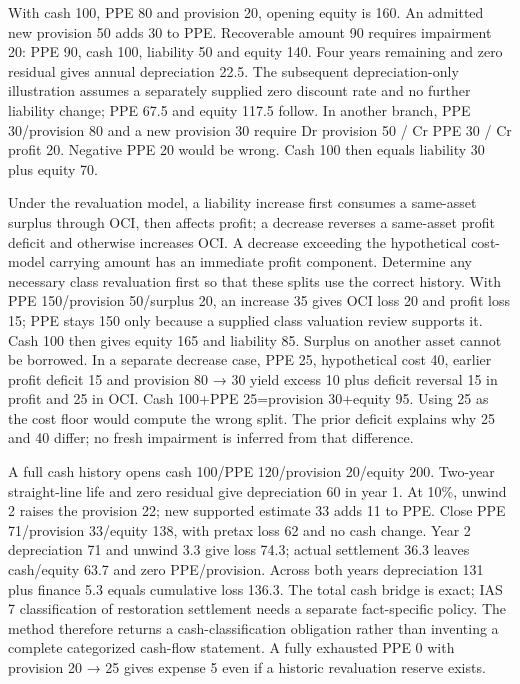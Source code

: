 With cash 100, PPE 80 and provision 20, opening equity is 160. An admitted new provision 50 adds 30 to PPE. Recoverable amount 90 requires impairment 20: PPE 90, cash 100, liability 50 and equity 140. Four years remaining and zero residual gives annual depreciation 22.5. The subsequent depreciation-only illustration assumes a separately supplied zero discount rate and no further liability change; PPE 67.5 and equity 117.5 follow. In another branch, PPE 30/provision 80 and a new provision 30 require Dr provision 50 / Cr PPE 30 / Cr profit 20. Negative PPE 20 would be wrong. Cash 100 then equals liability 30 plus equity 70.

Under the revaluation model, a liability increase first consumes a same-asset surplus through OCI, then affects profit; a decrease reverses a same-asset profit deficit and otherwise increases OCI. A decrease exceeding the hypothetical cost-model carrying amount has an immediate profit component. Determine any necessary class revaluation first so that these splits use the correct history. With PPE 150/provision 50/surplus 20, an increase 35 gives OCI loss 20 and profit loss 15; PPE stays 150 only because a supplied class valuation review supports it. Cash 100 then gives equity 165 and liability 85. Surplus on another asset cannot be borrowed. In a separate decrease case, PPE 25, hypothetical cost 40, earlier profit deficit 15 and provision 80 → 30 yield excess 10 plus deficit reversal 15 in profit and 25 in OCI. Cash 100+PPE 25=provision 30+equity 95. Using 25 as the cost floor would compute the wrong split. The prior deficit explains why 25 and 40 differ; no fresh impairment is inferred from that difference.

A full cash history opens cash 100/PPE 120/provision 20/equity 200. Two-year straight-line life and zero residual give depreciation 60 in year 1. At 10\%, unwind 2 raises the provision 22; new supported estimate 33 adds 11 to PPE. Close PPE 71/provision 33/equity 138, with pretax loss 62 and no cash change. Year 2 depreciation 71 and unwind 3.3 give loss 74.3; actual settlement 36.3 leaves cash/equity 63.7 and zero PPE/provision. Across both years depreciation 131 plus finance 5.3 equals cumulative loss 136.3. The total cash bridge is exact; IAS 7 classification of restoration settlement needs a separate fact-specific policy. The method therefore returns a cash-classification obligation rather than inventing a complete categorized cash-flow statement. A fully exhausted PPE 0 with provision 20 → 25 gives expense 5 even if a historic revaluation reserve exists.


